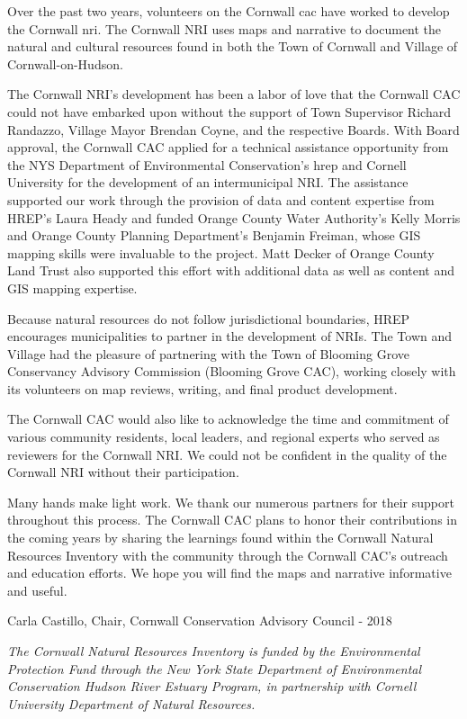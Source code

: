 Over the past two years, volunteers on the Cornwall \gls{cac} have 
worked to develop the Cornwall \gls{nri}. The Cornwall NRI uses maps and 
narrative to document the natural and cultural resources found in both the Town 
of Cornwall and Village of Cornwall-on-Hudson.
\par
The Cornwall NRI’s development has been a labor of love that the Cornwall CAC 
could not have embarked upon without the support of Town Supervisor Richard 
Randazzo, Village Mayor Brendan Coyne, and the respective Boards. With Board 
approval, the Cornwall CAC applied for a technical assistance opportunity from 
the NYS Department of Environmental Conservation’s \gls{hrep} and Cornell 
University for the development of an intermunicipal NRI. The assistance 
supported our work through the provision of data and content expertise from 
HREP’s Laura Heady and funded Orange County Water Authority’s Kelly Morris and 
Orange County Planning Department's Benjamin Freiman, whose GIS mapping skills 
were invaluable to the project. Matt Decker of Orange County Land Trust also 
supported this effort with additional data as well as content and GIS mapping 
expertise.
\par
Because natural resources do not follow jurisdictional boundaries, HREP 
encourages municipalities to partner in the development of NRIs. The Town and 
Village had the pleasure of partnering with the Town of Blooming Grove 
Conservancy Advisory Commission (Blooming Grove CAC), working closely with its 
volunteers on map reviews, writing, and final product development.
\par
The Cornwall CAC would also like to acknowledge the time and commitment of 
various community residents, local leaders, and regional experts who served as 
reviewers for the Cornwall NRI. We could not be confident in the quality of 
the Cornwall NRI without their participation.
\par
Many hands make light work. We thank our numerous partners for their support 
throughout this process. The Cornwall CAC plans to honor their contributions 
in the coming years by sharing the learnings found within the Cornwall Natural 
Resources Inventory with the community through the Cornwall CAC’s outreach and 
education efforts. We hope you will find the maps and narrative informative 
and useful.
\par
\hfill Carla Castillo, Chair, Cornwall Conservation Advisory Council - 2018
\par
\textit{The Cornwall Natural Resources Inventory is funded by the Environmental 
Protection Fund through the New York State Department of Environmental 
Conservation Hudson River Estuary Program, in partnership with Cornell University Department of Natural Resources.}

